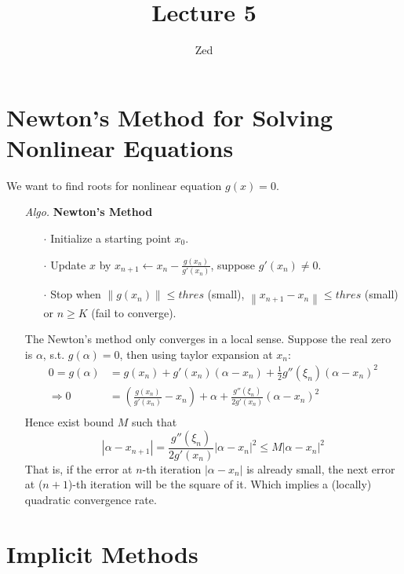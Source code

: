 \documentclass[a4paper, 11pt]{article}
\title{\textbf{Lecture 5}}
\author{Zed}
\begin{document}
\maketitle
\section{Newton's Method for Solving Nonlinear Equations}
We want to find roots for nonlinear equation $g(x)=0$. 
\begin{itemize}
	\item[\textit{Algo.}] \textbf{Newton's Method}
	\begin{itemize}
		\item[$\cdot$] Initialize a starting point $x_0$. 
		\item[$\cdot$] Update $x$ by $x_{n+1} \leftarrow x_n - \frac{g(x_n)}{g'(x_n)}$, suppose $g'(x_n)\ne 0$.
		\item[$\cdot$] Stop when $\left\|g(x_n)\right\| \leq thres$ (small), $\left\|x_{n+1} - x_n\right\| \leq thres$ (small) or $n\geq K$ (fail to converge). 
	\end{itemize}
	The Newton's method only converges in a local sense. Suppose the real zero is $\alpha$, s.t. $g(\alpha)=0$, then using taylor expansion at $x_n$:
	\begin{equation}
		 \begin{split}
		 	0 = g(\alpha) &= g(x_n) + g'(x_n)(\alpha - x_n) + \frac{1}{2}g''(\xi_n)(\alpha - x_n)^2 \\
		 	\Rightarrow 0 &= \left(\frac{g(x_n)}{g'(x_n)} - x_n\right) + \alpha + \frac{g''(\xi_n)}{2g'(x_n)}(\alpha - x_n)^2 \\
		 \end{split}
	\end{equation}
	Hence exist bound $M$ such that 
	$$
	|\alpha - x_{n+1}| = \frac{g''(\xi_n)}{2g'(x_n)}|\alpha - x_n|^2 \leq M|\alpha - x_n|^2
	$$
	That is, if the error at $n$-th iteration $|\alpha - x_n|$ is already small, the next error at ($n+1$)-th iteration will be the square of it. Which implies a (locally) quadratic convergence rate.
\end{itemize}

\section{Implicit Methods}
\end{document}
